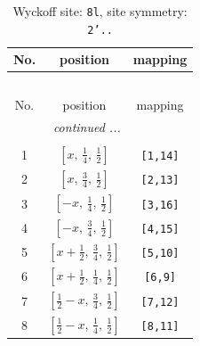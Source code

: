 \documentclass[fleqn,8pt]{jsarticle}
\begin{document}
\begin{longtable}{ccc}
\caption{Wyckoff site: {\tt 8l}, site symmetry: {\tt 2'..}}
 \\
 \hline \hline
No. & position & mapping \\ \hline \endfirsthead

\multicolumn{2}{l}{\tablename\ \thetable{}} \\
 \hline \hline
No. & position & mapping \\ \hline \endhead

 \hline \hline
\multicolumn{2}{r}{\footnotesize\it continued ...} \\ \endfoot

 \hline \hline
\multicolumn{2}{r}{} \\ \endlastfoot

1 & $\left[ x,\, \frac{1}{4},\, \frac{1}{2} \right]$ & {\tt [1,14]} \\ \hline
2 & $\left[ x,\, \frac{3}{4},\, \frac{1}{2} \right]$ & {\tt [2,13]} \\ \hline
3 & $\left[ - x,\, \frac{1}{4},\, \frac{1}{2} \right]$ & {\tt [3,16]} \\ \hline
4 & $\left[ - x,\, \frac{3}{4},\, \frac{1}{2} \right]$ & {\tt [4,15]} \\ \hline
5 & $\left[ x + \frac{1}{2},\, \frac{3}{4},\, \frac{1}{2} \right]$ & {\tt [5,10]} \\ \hline
6 & $\left[ x + \frac{1}{2},\, \frac{1}{4},\, \frac{1}{2} \right]$ & {\tt [6,9]} \\ \hline
7 & $\left[ \frac{1}{2} - x,\, \frac{3}{4},\, \frac{1}{2} \right]$ & {\tt [7,12]} \\ \hline
8 & $\left[ \frac{1}{2} - x,\, \frac{1}{4},\, \frac{1}{2} \right]$ & {\tt [8,11]} \\
\end{longtable}
\renewcommand{\arraystretch}{1.2}
\end{document}
